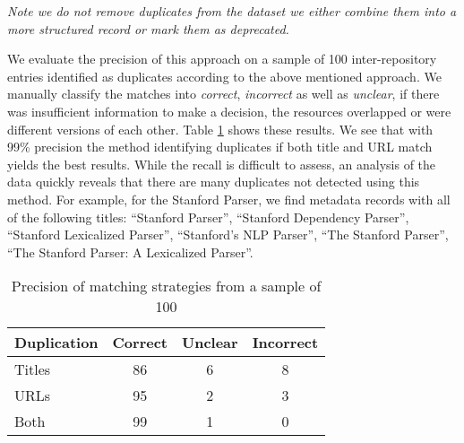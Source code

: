 \documentclass[11pt]{article}
\begin{document}
\emph{Note we do not remove duplicates from the dataset we either combine them
into a more structured record or mark them as deprecated.}



We evaluate the precision of this approach on a sample of 100 inter-repository entries identified
as duplicates according to the above mentioned approach. We manually classify
the matches into \emph{correct}, \emph{incorrect} as well as \emph{unclear}, if
there was insufficient information to make a decision, the resources overlapped
or were different versions of each other. Table \ref{tab:dupe-precision} shows
these results. We see that with 99\% precision the method identifying duplicates
if both title and URL match yields the best results. While the recall is
difficult to assess, an analysis of the data quickly reveals that there are many
duplicates not detected using this method. For example, for the Stanford Parser,
we find metadata records with all of the following titles: ``Stanford Parser'',
``Stanford Dependency Parser'',  ``Stanford Lexicalized Parser'', ``Stanford's
NLP Parser'', ``The Stanford Parser'', ``The Stanford Parser: A Lexicalized
Parser''.



\begin{table}
    \begin{tabular}{l|ccc}
        Duplication & Correct & Unclear & Incorrect \\
        \hline                    
        Titles      &    86   &   6     &    8      \\ 
        URLs        &    95   &   2     &    3      \\
        Both        &    99   &   1     &    0      \\
    \end{tabular}
    \caption{\label{tab:dupe-precision}Precision of matching strategies from a
    sample of 100}
\end{table}
\end{document}
